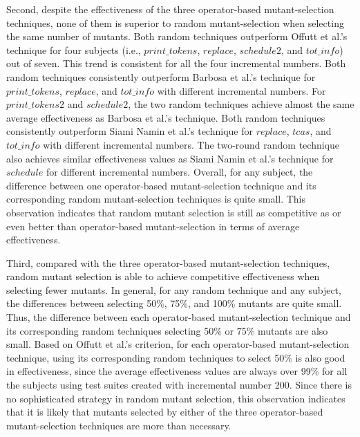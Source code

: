 Second, despite the effectiveness of the three operator-based
mutant-selection techniques, none of them is superior to random
mutant-selection when selecting the same number of mutants. Both
random techniques outperform Offutt et al.'s technique for four
subjects (i.e., $print\_tokens$, $replace$, $schedule2$, and
$tot\_info$) out of seven. This trend is consistent for all the
four incremental numbers. Both random techniques consistently
outperform Barbosa et al.'s technique for $print\_tokens$,
$replace$, and $tot\_info$ with different incremental numbers. For
$print\_tokens2$ and $schedule2$, the two random techniques
achieve almost the same average effectiveness as Barbosa et al.'s
technique. Both random techniques consistently outperform Siami
Namin et al.'s technique for $replace$, $tcas$, and $tot\_info$
with different incremental numbers. The two-round random technique
also achieves similar effectiveness values as Siami Namin et al.'s
technique for $schedule$ for different incremental numbers.
Overall, for any subject, the difference between one operator-based
mutant-selection technique and its corresponding random
mutant-selection techniques is quite small. This observation
indicates that random mutant selection is still as competitive as
or even better than operator-based mutant-selection in terms of
average effectiveness.

Third, compared with the three operator-based mutant-selection
techniques, random mutant selection is able to achieve competitive
effectiveness when selecting fewer mutants. In general, for any
random technique and any subject, the differences between
selecting 50\%, 75\%, and 100\% mutants are quite small. Thus, the
difference between each operator-based mutant-selection technique
and its corresponding random techniques selecting 50\% or 75\%
mutants are also small. Based on Offutt et al.'s criterion, for
each operator-based mutant-selection technique, using its
corresponding random techniques to select 50\% is also good in
effectiveness, since the average effectiveness values are always over
99\% for all the subjects using test suites created with
incremental number 200. Since there is no sophisticated strategy
in random mutant selection, this observation indicates that it is
likely that mutants selected by either of the three operator-based
mutant-selection techniques are more than necessary.


